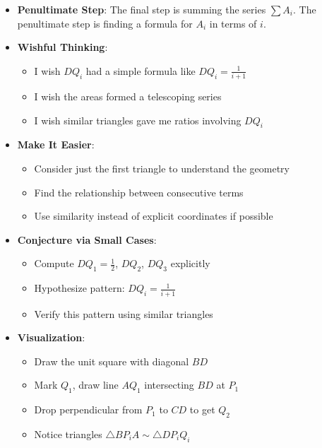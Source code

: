 \documentclass[]{article}
\begin{document}
\begin{strategicbox}
\begin{itemize}[leftmargin=*]
    \item \textbf{Penultimate Step}: The final step is summing the series $\sum A_i$. The penultimate step is finding a formula for $A_i$ in terms of $i$.
    
    \item \textbf{Wishful Thinking}: 
    \begin{itemize}
        \item I wish $DQ_i$ had a simple formula like $DQ_i = \frac{1}{i+1}$
        \item I wish the areas formed a telescoping series
        \item I wish similar triangles gave me ratios involving $DQ_i$
    \end{itemize}
    
    \item \textbf{Make It Easier}:
    \begin{itemize}
        \item Consider just the first triangle to understand the geometry
        \item Find the relationship between consecutive terms
        \item Use similarity instead of explicit coordinates if possible
    \end{itemize}
    
    \item \textbf{Conjecture via Small Cases}:
    \begin{itemize}
        \item Compute $DQ_1 = \frac{1}{2}$, $DQ_2$, $DQ_3$ explicitly
        \item Hypothesize pattern: $DQ_i = \frac{1}{i+1}$
        \item Verify this pattern using similar triangles
    \end{itemize}
    
    \item \textbf{Visualization}:
    \begin{itemize}
        \item Draw the unit square with diagonal $BD$
        \item Mark $Q_1$, draw line $AQ_1$ intersecting $BD$ at $P_1$
        \item Drop perpendicular from $P_1$ to $CD$ to get $Q_2$
        \item Notice triangles $\triangle BP_iA \sim \triangle DP_iQ_i$
    \end{itemize}
\end{itemize}


\end{strategicbox}
\end{document}
